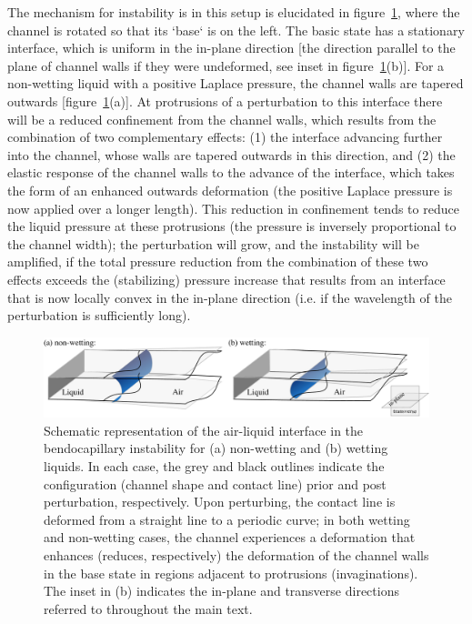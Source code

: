 \documentclass{jfm}
\begin{document}
The mechanism for instability is in this setup is elucidated in figure~\ref{fig:mechanism_schematic}, where the channel is rotated so that its `base` is on the left. The basic state has a stationary interface, which is uniform in the in-plane direction [the direction parallel to the plane of channel walls if they were undeformed, see inset in figure~\ref{fig:mechanism_schematic}(b)]. For a non-wetting liquid with a positive Laplace pressure, the channel walls are tapered outwards [figure~\ref{fig:mechanism_schematic}(a)]. At protrusions of a perturbation to this interface there will be a reduced confinement from the channel walls, which results from the combination of two complementary effects: (1) the interface advancing further into the channel, whose walls are tapered outwards in this direction, and (2) the elastic response of the channel walls to the advance of the interface, which takes the form of an enhanced outwards deformation (the positive Laplace pressure is now applied over a longer length). This reduction in confinement tends to reduce the liquid pressure at these protrusions (the pressure is inversely proportional to the channel width); the perturbation will grow, and the instability will be amplified, if the total pressure reduction from the combination of these two effects exceeds the (stabilizing) pressure increase that results from an interface that is now locally convex in the in-plane direction (i.e. if the wavelength of the perturbation is sufficiently long).

\begin{figure}
    \centering
    \includegraphics[width=\textwidth]{figures/fig2_mechanism_schematic.pdf}
    \caption{Schematic representation of the air-liquid interface in the bendocapillary instability for (a) non-wetting and (b) wetting liquids. In each case, the grey and black outlines indicate the configuration (channel shape and contact line) prior and post perturbation, respectively. Upon perturbing, the contact line is deformed from a straight line to a periodic curve; in both wetting and non-wetting cases, the channel experiences a deformation that enhances (reduces, respectively) the deformation of the channel walls in the base state in regions adjacent to protrusions (invaginations). The inset in (b) indicates the in-plane and transverse directions referred to throughout the main text. }
    \label{fig:mechanism_schematic}
\end{figure}
\end{document}
